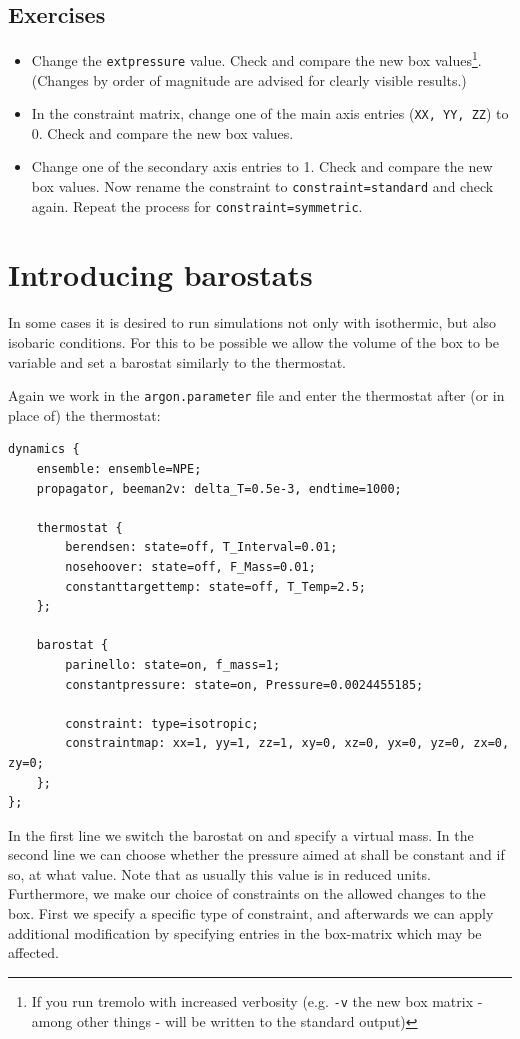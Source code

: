 \subsection{Exercises}
\begin{itemize}
 \item Change the \texttt{extpressure} value. Check and compare the new box values\footnote{If you run tremolo with increased verbosity (e.g. \texttt{-v} the new box matrix - among other things - will be written to the standard output)}. (Changes by order of magnitude are advised for clearly visible results.)
 \item In the constraint matrix, change one of the main axis entries (\texttt{XX, YY, ZZ}) to 0. Check and compare the new box values.
 \item Change one of the secondary axis entries to 1.
  Check and compare the new box values. Now rename the constraint to \texttt{constraint=standard} and check again. 
  Repeat the process for \texttt{constraint=symmetric}.
\end{itemize}


\section{Introducing barostats}
\label{tutorial:barostat}
In some cases it is desired to run simulations not only with isothermic, but also isobaric conditions.
For this to be possible we allow the volume of the box to be variable and set a barostat similarly to the thermostat.

Again we work in the \texttt{argon.parameter} file and enter the thermostat after (or in place of) the thermostat: 
\begin{lstlisting}
dynamics {
    ensemble: ensemble=NPE;
    propagator, beeman2v: delta_T=0.5e-3, endtime=1000;

    thermostat {
        berendsen: state=off, T_Interval=0.01;
        nosehoover: state=off, F_Mass=0.01;
        constanttargettemp: state=off, T_Temp=2.5;
    };

    barostat {
        parinello: state=on, f_mass=1;
        constantpressure: state=on, Pressure=0.0024455185;

        constraint: type=isotropic;
        constraintmap: xx=1, yy=1, zz=1, xy=0, xz=0, yx=0, yz=0, zx=0, zy=0;
    };
};
\end{lstlisting}
In the first line we switch the barostat on and specify a virtual mass.
In the second line we can choose whether the pressure aimed at shall be constant and if so, at what value. Note that as usually this value is in reduced units.
Furthermore, we make our choice of constraints on the allowed changes to the box. First we specify a specific type of constraint, and afterwards we can apply
additional modification by specifying entries in the box-matrix which may be affected.

